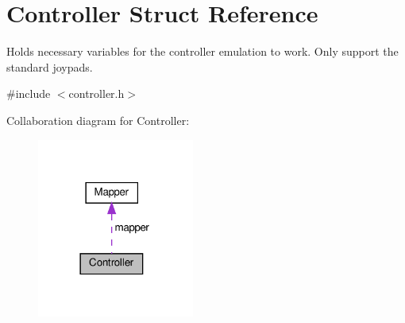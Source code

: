 \hypertarget{struct_controller}{}\section{Controller Struct Reference}
\label{struct_controller}


Holds necessary variables for the controller emulation to work. Only support the standard joypads.  




{\ttfamily \#include $<$controller.\+h$>$}



Collaboration diagram for Controller\+:\nopagebreak
\begin{figure}[H]
\begin{center}
\leavevmode
\includegraphics[width=146pt]{struct_controller__coll__graph}
\end{center}
\end{figure}
